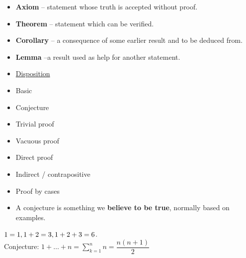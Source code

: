 \documentclass[english,10pt,a4paper]{article}
\begin{document}
\begin{minipage}[t]{0.7\linewidth}
\begin{theo}[Basic] 
\begin{itemize}
\item \textbf{Axiom} -- statement whose truth is accepted without proof.
\item \textbf{Theorem} -- statement which can be verified.
\item \textbf{Corollary} -- a consequence of some earlier result and to be deduced from.
\item \textbf{Lemma} --a result used as help for another statement.
\end{itemize}
\end{theo}
\end{minipage}
\hspace{0.1cm}
\begin{minipage}[t]{0.27\linewidth}
\begin{itemize}
\item[] \underline{Disposition}
\item Basic
\item Conjecture
\item Trivial proof
\item Vacuous proof
\item Direct proof
\item Indirect / contrapositive
\item Proof by cases
\end{itemize}
\end{minipage}



\begin{theo}[Conjecture] 

\begin{minipage}[t]{0.48\linewidth}
\begin{itemize}
\item A conjecture is something we \textbf{believe to be true}, normally based on examples.
\end{itemize}
\end{minipage}
\hspace{0.1cm}
\begin{minipage}[t]{0.48\linewidth}
$1=1, \\
1+2=3, \\
1+2+3=6$.
\\
Conjecture: $1+\ldots+n=\sum\limits_{k=1}^n n= \dfrac{n(n+1)}{2}$
\end{minipage}
\end{theo}
\end{document}
